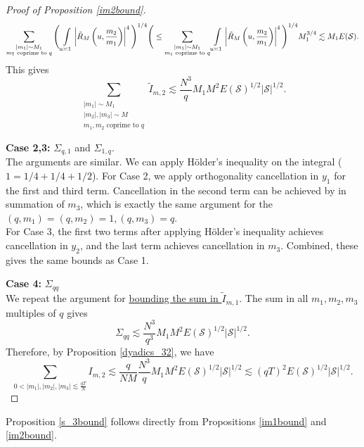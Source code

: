 \begin{proof}[{Proof of Proposition \ref{im2bound}}]
\[       \sum_{\substack{|m_1|\sim M_1\\ m_1\textrm{ coprime to }q}} \Bigg(\int\displaylimits_{u\asymp 1}  \left| \tilde{R}_M\left(u,\frac{m_2}{m_1}\right)\right|^4\Bigg)^{1/4}\Bigg(\leq \sum_{\substack{|m_1|\sim M_1\\ m_1\textrm{ coprime to }q}} \int\displaylimits_{u\asymp 1}  \left| \tilde{R}_M\left(u,\frac{m_2}{m_1}\right)\right|^4\Bigg)^{1/4} M_1^{3/4} \lesssim M_1 E(\mathcal{S}).
    \]
    This gives \[
    \sum_{\substack{|m_1|\sim M_1\\|m_2|,|m_3|\sim M\\
    m_1,m_2 \textrm{ coprime to } q}} \tilde{I}_{m,2} \lesssim \frac{N^3}{q}M_1M^2 E(\mathcal{S})^{1/2}|\mathcal{S}|^{1/2}.
    \]

    \textbf{Case 2,3:} $\Sigma_{q,1}$ and $\Sigma_{1,q}$. 
    \\
    The arguments are similar. We can apply H\"older's inequality on the integral ($1=1/4+1/4+1/2$). For Case 2, we apply orthogonality cancellation in $y_1$ for the first and third term. Cancellation in the second term can be achieved by in summation of $m_3$, which is exactly the same argument for the $(q,m_1)=(q,m_2)=1, (q,m_3)=q$. \\
    For Case 3, the first two terms after applying H\"older's inequality achieves cancellation in $y_2$, and the last term achieves cancellation in $m_3$. Combined, these gives the same bounds as Case 1.

    \textbf{Case 4:} $\Sigma_{qq}$\\
    We repeat the argument for \hyperref[im1boundproof]{bounding the sum in $\tilde{I}_{m,1}$}. The sum in all $m_1,m_2,m_3$ multiples of $q$ gives
    \[  
        \Sigma_{qq}\lesssim \frac{N^3}{q^3}M_1M^2E(\mathcal{S})^{1/2}|\mathcal{S}|^{1/2}.
    \]
    Therefore, by Proposition \ref{dyadics_32}, we have \[
    \sum_{0<|m_1|,|m_2|,|m_3|\lesssim \frac{qT}{N}} I_{m,2} \lesssim \frac{q}{NM}\frac{N^3}{q}M_1M^2E(\mathcal{S})^{1/2}|\mathcal{S}|^{1/2}\lesssim (qT)^2E(\mathcal{S})^{1/2}|\mathcal{S}|^{1/2}.
    \]
\end{proof}
Proposition \ref{s_3bound} follows directly from Propositions \ref{im1bound} and \ref{im2bound}.